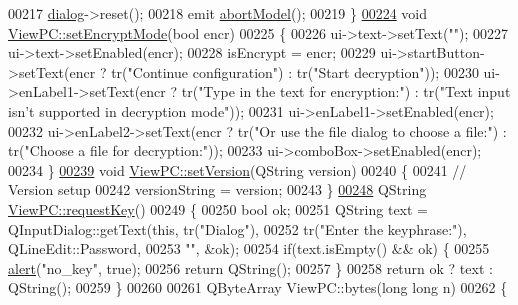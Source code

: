 \begin{DoxyCode}
00217     \hyperlink{class_view_p_c_a31abbb470fe329b44e6ffee202b903ca}{dialog}->reset();
00218     emit \hyperlink{class_view_p_c_aa652102ce6b5757b8eef830409c8cabf}{abortModel}();
00219 \}
\hypertarget{viewpc_8cpp_source.tex_l00224}{}\hyperlink{class_view_p_c_a5b48951efefdc0e3039c9a4bf185320b}{00224} \textcolor{keywordtype}{void} \hyperlink{class_view_p_c_a5b48951efefdc0e3039c9a4bf185320b}{ViewPC::setEncryptMode}(\textcolor{keywordtype}{bool} encr)
00225 \{
00226     ui->text->setText(\textcolor{stringliteral}{""});
00227     ui->text->setEnabled(encr);
00228     isEncrypt = encr;
00229     ui->startButton->setText(encr ? tr(\textcolor{stringliteral}{"Continue configuration"}) : tr(\textcolor{stringliteral}{"Start decryption"}));
00230     ui->enLabel1->setText(encr ? tr(\textcolor{stringliteral}{"Type in the text for encryption:"}) : tr(\textcolor{stringliteral}{"Text input isn't supported in
       decryption mode"}));
00231     ui->enLabel1->setEnabled(encr);
00232     ui->enLabel2->setText(encr ? tr(\textcolor{stringliteral}{"Or use the file dialog to choose a file:"}) : tr(\textcolor{stringliteral}{"Choose a file for
       decryption:"}));
00233     ui->comboBox->setEnabled(encr);
00234 \}
\hypertarget{viewpc_8cpp_source.tex_l00239}{}\hyperlink{class_view_p_c_ac05220df875b7c4f24405a5742476ebf}{00239} \textcolor{keywordtype}{void} \hyperlink{class_view_p_c_ac05220df875b7c4f24405a5742476ebf}{ViewPC::setVersion}(QString version)
00240 \{
00241     \textcolor{comment}{// Version setup}
00242     versionString = version;
00243 \}
\hypertarget{viewpc_8cpp_source.tex_l00248}{}\hyperlink{class_view_p_c_a559c95675ec98b15451f3bca47033d9c}{00248} QString \hyperlink{class_view_p_c_a559c95675ec98b15451f3bca47033d9c}{ViewPC::requestKey}()
00249 \{
00250     \textcolor{keywordtype}{bool} ok;
00251     QString text = QInputDialog::getText(\textcolor{keyword}{this}, tr(\textcolor{stringliteral}{"Dialog"}),
00252                                          tr(\textcolor{stringliteral}{"Enter the keyphrase:"}), QLineEdit::Password,
00253                                          \textcolor{stringliteral}{""}, &ok);
00254     \textcolor{keywordflow}{if}(text.isEmpty() && ok) \{
00255         \hyperlink{class_view_p_c_a7c467169467789561078abc9d4fe57bd}{alert}(\textcolor{stringliteral}{"no\_key"}, \textcolor{keyword}{true});
00256         \textcolor{keywordflow}{return} QString();
00257     \}
00258     \textcolor{keywordflow}{return} ok ? text : QString();
00259 \}
00260 
00261 QByteArray ViewPC::bytes(\textcolor{keywordtype}{long} \textcolor{keywordtype}{long} n)
00262 \{

\end{DoxyCode}
